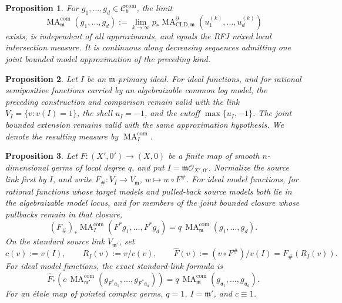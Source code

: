 \documentclass[11pt,a4paper]{article}
\newtheorem{proposition}[proposition]{Proposition}
\theoremstyle{definition}
\theoremstyle{remark}
\DeclareMathOperator{\MA}{MA}
\begin{document}
\begin{proposition}\label{prop:frontier-local-ma-bounded-closure}
For \(g_1,\ldots,g_d\in\mathcal C_b^{\mathrm{com}}\), the limit
\begin{equation}
 \MA^{\mathrm{com}}_{\mathfrak m}(g_1,\ldots,g_d)
 :=\lim_{k\to\infty}
 p_*\MA^{\partial}_{\mathrm{CLD},\mathfrak m}
       (u_1^{(k)},\ldots,u_d^{(k)})
 \label{eq:frontier-local-ma-bounded-limit}
\end{equation}
exists, is independent of all approximants, and equals the BFJ mixed local
intersection measure.  It is continuous along decreasing sequences admitting
one joint bounded model approximation of the preceding kind.
\end{proposition}



\begin{proposition}\label{prop:frontier-local-ma-reference-ideal}
Let \(I\) be an \(\mathfrak m\)-primary ideal.  For ideal functions, and for
rational semipositive functions carried by an algebraizable common log
model, the preceding construction and comparison remain valid with the link
\(V_I=\{v:v(I)=1\}\), the shell \(u_I=-1\), and the cutoff
\(\max\{u_I,-1\}\).  The joint bounded extension remains valid with the
same approximation hypothesis.  We denote the resulting measure by
\(\MA_I^{\mathrm{com}}\).
\end{proposition}



\begin{proposition}\label{prop:frontier-local-ma-finite-map}
Let \(F:(X',0')\to(X,0)\) be a finite map of smooth
\(n\)-dimensional germs of local degree \(q\), and put
\(I=\mathfrak m\mathcal O_{X',0'}\).  Normalize the source link first by
\(I\), and write
\(F_\#:V_I\to V_{\mathfrak m}\), \(w\mapsto w\circ F^\#\).  For ideal
model functions, for rational functions whose target models and pulled-back
source models both lie in the algebraizable model locus, and for members of the joint bounded
closure whose pullbacks remain in that closure,
\begin{equation}
 (F_\#)_*\MA^{\mathrm{com}}_I(F^*g_1,\ldots,F^*g_d)
 =q\,\MA^{\mathrm{com}}_{\mathfrak m}(g_1,\ldots,g_d).
 \label{eq:frontier-local-ma-finite-projection}
\end{equation}
On the standard source link \(V_{\mathfrak m'}\), set
\[
 c(v):=v(I),\qquad R_I(v):=v/c(v),\qquad
 \widehat F(v):=(v\circ F^\#)/v(I)=F_\#(R_I(v)).
\]
For ideal model functions, the exact standard-link formula is
\begin{equation}
 \widehat F_*\!\left(
 c\,\MA^{\mathrm{com}}_{\mathfrak m'}
   (g_{F^*\mathfrak a_1},\ldots,g_{F^*\mathfrak a_d})\right)
 =q\,\MA^{\mathrm{com}}_{\mathfrak m}
   (g_{\mathfrak a_1},\ldots,g_{\mathfrak a_d}).
 \label{eq:frontier-local-ma-standard-link}
\end{equation}
For an \'etale map of pointed complex germs, \(q=1\),
\(I=\mathfrak m'\), and \(c\equiv1\).
\end{proposition}
\end{document}
